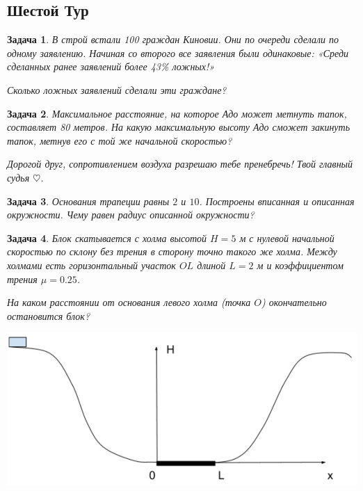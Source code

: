 \documentclass[a4paper, 11pt]{article}
\theoremstyle{break}
\newtheorem{problem}{Задача}[subsection]
\begin{document}
\thispagestyle{empty}
\subsection*{Шестой Тур}


\begin{problem}
В строй встали 100 граждан Киновии. Они по очереди сделали по одному заявлению.
Начиная со второго все заявления были одинаковые: «Среди сделанных ранее заявлений более 43\% ложных!»

Сколько ложных заявлений сделали эти граждане?
\end{problem}

\begin{problem}
Максимальное расстояние, на которое Адо может метнуть тапок, составляет 80 метров.
На какую максимальную высоту Адо сможет закинуть тапок, метнув его с той же
начальной скоростью?

Дорогой друг, сопротивлением воздуха разрешаю тебе пренебречь! Твой главный судья $\heartsuit$.
\end{problem}


\begin{problem}
Основания трапеции равны $2$ и $10$. Построены вписанная и описанная окружности.
Чему равен радиус описанной окружности?
\end{problem}

\begin{problem}
Блок скатывается с холма высотой $H=5$ м с нулевой начальной скоростью по склону
без трения в сторону точно такого же холма. Между холмами есть горизонтальный участок
$OL$ длиной $L=2$ м и коэффициентом трения $\mu = 0.25$.

На каком расстоянии от основания левого холма (точка $O$) окончательно остановится блок?

\includegraphics[scale=0.3]{images/6tour_sliding_block.png}
\end{problem}
\end{document}
